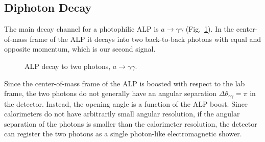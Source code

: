 \documentclass[12pt,a4paper]{article}
\begin{document}
\subsection{Diphoton Decay}

The main decay channel for a photophilic ALP is $a\to\gamma\gamma$
(Fig.~\ref{fig:alp-diphoton-decay}). In the center-of-mass frame of the ALP it
decays into two back-to-back photons with equal and opposite momentum, which is
our second signal.

\begin{figure}[H]
\centering
{}
\caption{ALP decay to two photons, \(a\to\gamma\gamma\).}
\label{fig:alp-diphoton-decay}
\end{figure}

Since the center-of-mass frame of the ALP is boosted with respect to the lab
frame, the two photons do not generally have an angular separation
$\Delta\theta_{\gamma\gamma}=\pi$ in the detector. Instead, the opening angle
is a function of the ALP boost. Since calorimeters do not have arbitrarily
small angular resolution, if the angular separation of the photons is smaller
than the calorimeter resolution, the detector can register the two photons as
a single photon-like electromagnetic shower.
\end{document}
